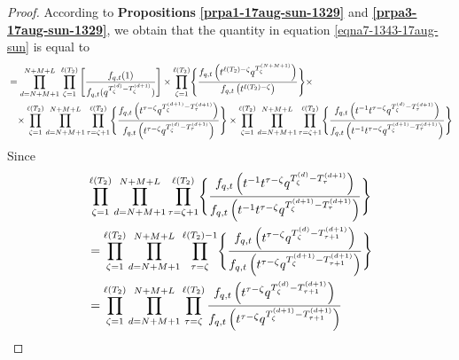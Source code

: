 \documentclass[12pt,reqno,a4paper]{amsart}
\numberwithin{equation}{section}
\theoremstyle{definition}
\begin{document}
\begin{proof}
According to \textbf{Propositions} \textbf{\ref{prpa1-17aug-sun-1329}} and \textbf{\ref{prpa3-17aug-sun-1329}}, we obtain that the quantity in equation \eqref{eqna7-1343-17aug-sun} is equal to 
\footnotesize
\begin{align}
&= 
\prod_{d = N+M+1}^{N+M+L}
\prod_{\zeta = 1}^{\ell(T_2)}
\left[
\frac{
	f_{q,t}(1)
}{
	f_{q,t}(q^{T^{(d)}_{\zeta} - T^{(d+1)}_{\zeta}})
}
\right]
\times
\prod_{\zeta = 1}^{\ell(T_2)}
\Biggl\{
\frac{f_{q,t}\left(		t^{\ell(T_2) - \zeta} q^{ T^{(N+M+1)}_{\zeta}		}					\right)}{
	f_{q,t}\left(		t^{\ell(T_2) - \zeta} 					\right)
}
\Biggr\}
\times
\\
&\hspace{0.3cm}\times 
\prod_{\zeta = 1}^{\ell(T_2)}
\prod_{d = N+M+1}^{N+M+L}
\prod_{\tau = \zeta + 1}^{\ell(T_2)}
\Biggl\{
\frac{
	f_{q,t}\left(	t^{\tau - \zeta} q^{ T^{(d+1)}_{\zeta} 	- T^{(d+1)}_{\tau}	 		}						\right)
}{
	f_{q,t}\left(	t^{\tau - \zeta} q^{ T^{(d)}_{\zeta} 	- T^{(d+1)}_{\tau}		}						\right)
}
\Biggr\} 
\times
\prod_{\zeta = 1}^{\ell(T_2)}
\prod_{d = N+M+1}^{N+M+L}
\prod_{\tau = \zeta + 1}^{\ell(T_2)}
\Biggl\{
\frac{
	f_{q,t}\left(		t^{-1}		
	t^{\tau - \zeta} q^{ T^{(d)}_{\zeta} 	- T^{(d+1)}_{\tau} 		}					\right)
}{
	f_{q,t}\left(		t^{-1}		
	t^{\tau - \zeta} q^{ T^{(d+1)}_{\zeta} 	- T^{(d+1)}_{\tau}			}					\right)
}
\Biggr\} 
\notag 
\end{align}
\normalsize
Since 
\footnotesize
\begin{align}
	&\prod_{\zeta = 1}^{\ell(T_2)}
	\prod_{d = N+M+1}^{N+M+L}
	\prod_{\tau = \zeta + 1}^{\ell(T_2)}
	\Biggl\{
	\frac{
		f_{q,t}\left(		t^{-1}		
		t^{\tau - \zeta} q^{ T^{(d)}_{\zeta} 	- T^{(d+1)}_{\tau} 		}					\right)
	}{
		f_{q,t}\left(		t^{-1}		
		t^{\tau - \zeta} q^{ T^{(d+1)}_{\zeta} 	- T^{(d+1)}_{\tau}			}					\right)
	}
	\Biggr\} 
	\\
	&= 
	\prod_{\zeta = 1}^{\ell(T_2)}
	\prod_{d = N+M+1}^{N+M+L}
	\prod_{\tau = \zeta}^{\ell(T_2) - 1}
	\Biggl\{
	\frac{
		f_{q,t}\left(		
		t^{\tau - \zeta} q^{ T^{(d)}_{\zeta} 	- T^{(d+1)}_{\tau + 1} 		}					\right)
	}{
		f_{q,t}\left(		
		t^{\tau- \zeta} q^{ T^{(d+1)}_{\zeta} 	- T^{(d+1)}_{\tau + 1}			}					\right)
	}
	\Biggr\} 
	\notag 
	\\
	&=
	\prod_{\zeta = 1}^{\ell(T_2)}
	\prod_{d = N+M+1}^{N+M+L}
	\prod_{\tau = \zeta}^{\ell(T_2)}
	\frac{
		f_{q,t}\left(		
		t^{\tau - \zeta} q^{ T^{(d)}_{\zeta} 	- T^{(d+1)}_{\tau + 1} 		}					\right)
	}{
		f_{q,t}\left(		
		t^{\tau- \zeta} q^{ T^{(d+1)}_{\zeta} 	- T^{(d+1)}_{\tau + 1}			}					\right)
}
\end{align}
\end{proof}
\end{document}

